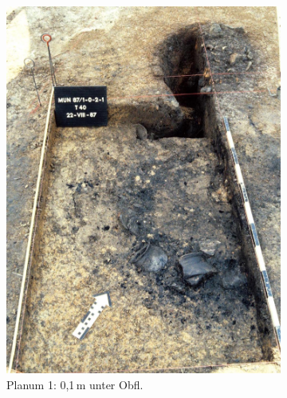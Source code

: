 \begin{figure}[p]
	\centering
	\begin{subfigure}[t]{0.32\textwidth}
		\centering
		\includegraphics[width = \textwidth]{fig/MUN87-102_Pl1_E87-040-6.jpg}
		\caption{Planum 1: 0,1\,m unter Obfl.}
		\label{fig:MUN87-1-0-2_Pl_1}
	\end{subfigure}\hfill
	\begin{subfigure}[t]{0.32\textwidth}
		\centering

\end{subfigure}
\end{figure}
